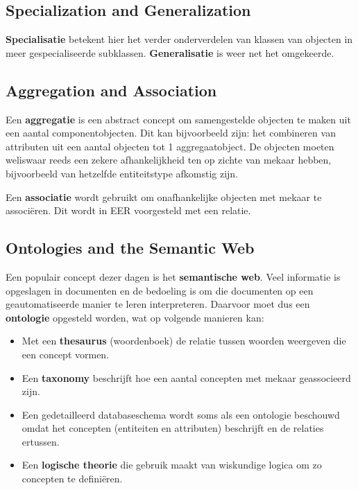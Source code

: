 \subsection{Specialization and Generalization}
\textbf{Specialisatie} betekent hier het verder onderverdelen van klassen van objecten in meer gespecialiseerde subklassen. \textbf{Generalisatie} is weer net het omgekeerde.

\subsection{Aggregation and Association}
Een \textbf{aggregatie} is een abstract concept om samengestelde objecten te maken uit een aantal componentobjecten. Dit kan bijvoorbeeld zijn: het combineren van attributen uit een aantal objecten tot 1 aggregaatobject. De objecten moeten weliswaar reeds een zekere afhankelijkheid ten op zichte van mekaar hebben, bijvoorbeeld van hetzelfde entiteitstype afkomstig zijn.

Een \textbf{associatie} wordt gebruikt om onafhankelijke objecten met mekaar te associ\"eren. Dit wordt in EER voorgesteld met een relatie.

\subsection{Ontologies and the Semantic Web}
Een populair concept dezer dagen is het \textbf{semantische web}. Veel informatie is opgeslagen in documenten en de bedoeling is om die documenten op een geautomatiseerde manier te leren interpreteren. Daarvoor moet dus een \textbf{ontologie} opgesteld worden, wat op volgende manieren kan:
\begin{itemize}
\item Met een \textbf{thesaurus} (woordenboek) de relatie tussen woorden weergeven die een concept vormen.
\item Een \textbf{taxonomy} beschrijft hoe een aantal concepten met mekaar geassocieerd zijn.
\item Een gedetailleerd databaseschema wordt soms als een ontologie beschouwd omdat het concepten (entiteiten en attributen) beschrijft en de relaties ertussen.
\item Een \textbf{logische theorie} die gebruik maakt van wiskundige logica om zo concepten te defini\"eren.
\end{itemize}